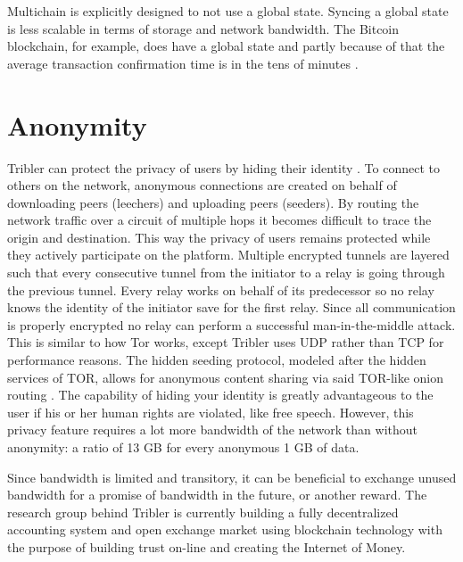 Multichain is explicitly designed to not use a global state.
Syncing a global state is less scalable in terms of storage and network bandwidth.
The Bitcoin blockchain, for example, does have a global state and partly because of that the average transaction confirmation time is in the tens of minutes \cite{bitcoin_avg-confirmation-time}.


\section{Anonymity}
Tribler can protect the privacy of users by hiding their identity \cite{anon_internet, tribler-anon-hd, anon_HD_streaming}.
To connect to others on the network, anonymous connections are created on behalf of downloading peers (leechers) and uploading peers (seeders).
By routing the network traffic over a circuit of multiple hops it becomes difficult to trace the origin and destination.
This way the privacy of users remains protected while they actively participate on the platform.
Multiple encrypted tunnels are layered such that every consecutive tunnel from the initiator to a relay is going through the previous tunnel.
Every relay works on behalf of its predecessor so no relay knows the identity of the initiator save for the first relay.
Since all communication is properly encrypted no relay can perform a successful man-in-the-middle attack.
This is similar to how Tor works, except Tribler uses UDP rather than TCP for performance reasons.
The hidden seeding protocol, modeled after the hidden services of TOR, allows for anonymous content sharing via said TOR-like onion routing \cite{tor_bittorrent}.
The capability of hiding your identity is greatly advantageous to the user if his or her human rights are violated, like free speech.
However, this privacy feature requires a lot more bandwidth of the network than without anonymity: a ratio of 13 GB for every anonymous 1 GB of data.

Since bandwidth is limited and transitory, it can be beneficial to exchange unused bandwidth for a promise of bandwidth in the future, or another reward.
The research group behind Tribler is currently building a fully decentralized accounting system and open exchange market using blockchain technology with the purpose of building trust on-line and creating the Internet of Money.


